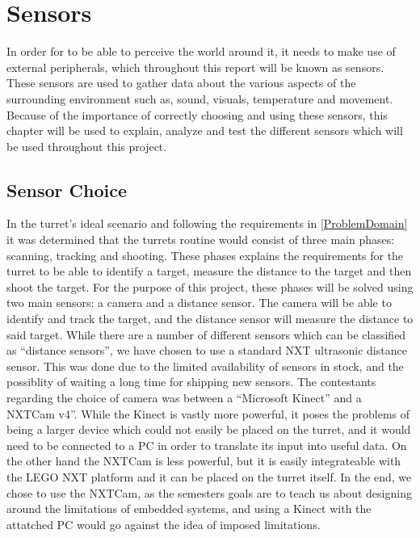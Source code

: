 \chapter{Sensors} \label{sensors}
In order for \name to be able to perceive the world around it,
it needs to make use of external peripherals, which throughout this report will
be known as sensors. These sensors are used to gather data about the various
aspects of the surrounding environment such as, sound, visuals, temperature and
movement. Because of the importance of correctly choosing and using these
sensors, this chapter will be used to explain, analyze and test the different
sensors which will be used throughout this project.

\section{Sensor Choice}
In the turret's ideal scenario and following the requirements in
\autoref{ProblemDomain} it was determined that the turrets routine would consist
of three main phases: scanning, tracking and shooting. These phases explains
the requirements for the turret to be able to identify a target, measure the
distance to the target and then shoot the target. For the purpose of this
project, these phases will be solved using two main sensors: a camera and a
distance sensor. The camera will be able to identify and track the target, and
the distance sensor will measure the distance to said target. While there are a
number of different sensors which can be classified as ``distance sensors'', we
have chosen to use a standard NXT ultrasonic distance sensor. This was done due
to the limited availability of sensors in stock, and the possiblity of waiting a
long time for shipping new sensors. The contestants regarding the choice of
camera was between a ``Microsoft Kinect'' and a NXTCam v4''. While the Kinect is
vastly more powerful, it poses the problems of being a larger device which could
not easily be placed on the turret, and it would need to be connected to a
PC in order to translate its input into useful data. On the other hand the
NXTCam is less powerful, but it is easily integrateable with the LEGO NXT
platform and it can be placed on the turret itself. In the end, we chose to use
the NXTCam, as the semesters goals are to teach us about designing around the
limitations of embedded systems, and using a Kinect with the attatched PC would
go against the idea of imposed limitations.




% 
% 
% 
% 
